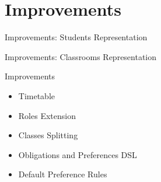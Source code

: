 \section{Improvements}

\begin{frame}{Improvements: Students Representation}
  \centering
\end{frame}

\begin{frame}{Improvements: Classrooms Representation}
  \centering
\end{frame}

\begin{frame}{Improvements}
  \begin{itemize}
    \item Timetable
    \item Roles Extension
    \item Classes Splitting
    \item Obligations and Preferences DSL
    \item Default Preference Rules
  \end{itemize}
\end{frame}
